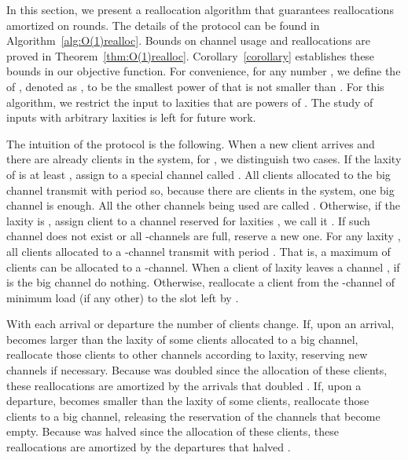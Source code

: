 

In this section, we present a reallocation algorithm that guarantees  reallocations amortized on rounds.
The details of the protocol can be found in Algorithm~\ref{alg:O(1)realloc}. 
Bounds on channel usage and reallocations are proved in Theorem~\ref{thm:O(1)realloc}. 
Corollary~\ref{corollary} establishes these bounds in our objective function. 
For convenience, for any number , we define the  of , denoted as , to be the smallest power of  that is not smaller than .
For this algorithm, we restrict the input to laxities that are powers of . The study of inputs with arbitrary laxities is left for future work.

The intuition of the protocol is the following. 
When a new client  arrives and there are already  clients in the system, for , we distinguish two cases.
If the laxity of  is at least , assign  to a special channel called . All clients allocated to the big channel transmit with period  so, because there are  clients in the system, one big channel is enough. All the other channels being used are called .
Otherwise, if the laxity is , assign client  to a channel reserved for laxities , we call it . If such channel does not exist or all -channels are full, reserve a new one.
For any laxity , all clients allocated to a -channel transmit with period . That is, a maximum of  clients can be allocated to a -channel.
When a client  of laxity  leaves a channel , if  is the big channel do nothing.
Otherwise, reallocate a client from the -channel of minimum load (if any other) to the slot left by .

With each arrival or departure the number of clients  change.
If, upon an arrival,  becomes larger than the laxity of some clients allocated to a big channel, reallocate those clients to other channels according to laxity, reserving new channels if necessary.
Because  was doubled since the allocation of these clients, these reallocations are amortized by the arrivals that doubled .
If, upon a departure,  becomes smaller than the laxity of some clients, reallocate those clients to a big channel, releasing the reservation of the channels that become empty.
Because  was halved since the allocation of these clients, these reallocations are amortized by the departures that halved .




